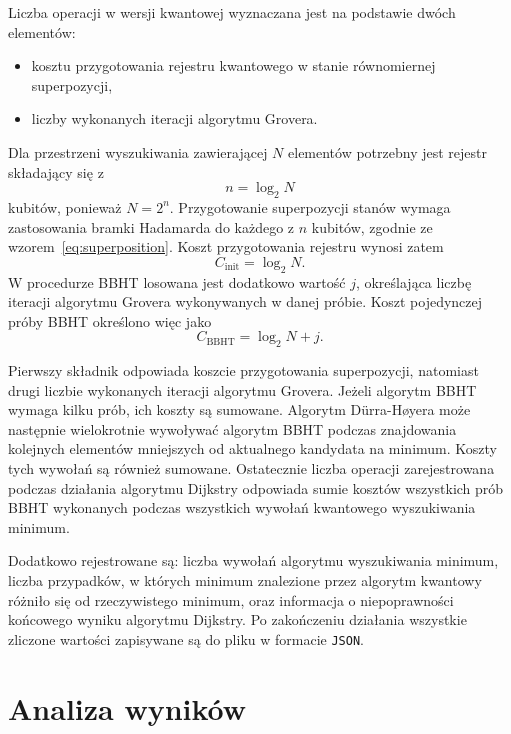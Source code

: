 Liczba operacji w wersji kwantowej wyznaczana jest na podstawie dwóch elementów:
\begin{itemize}
    \item kosztu przygotowania rejestru kwantowego w stanie równomiernej superpozycji,
    \item liczby wykonanych iteracji algorytmu Grovera.
\end{itemize}
\noindent
Dla przestrzeni wyszukiwania zawierającej $N$ elementów potrzebny jest rejestr składający się z
\begin{equation}
    n = \log_2 N
\end{equation}
\noindent
kubitów, ponieważ $N=2^n$. Przygotowanie superpozycji stanów wymaga zastosowania bramki Hadamarda do każdego z $n$ kubitów, zgodnie ze
wzorem~\eqref{eq:superposition}. Koszt przygotowania rejestru wynosi zatem
\begin{equation}
    C_{\mathrm{init}} = \log_2 N.
\end{equation}
\noindent
W procedurze BBHT losowana jest dodatkowo wartość $j$, określająca liczbę iteracji algorytmu Grovera wykonywanych w danej próbie. Koszt pojedynczej próby BBHT określono więc jako
\begin{equation}
    C_{\mathrm{BBHT}} = \log_2 N + j.
\end{equation}

Pierwszy składnik odpowiada koszcie przygotowania superpozycji, natomiast drugi liczbie wykonanych iteracji algorytmu Grovera. Jeżeli algorytm BBHT wymaga kilku prób, ich koszty są sumowane. Algorytm Dürra-Høyera może następnie wielokrotnie wywoływać algorytm BBHT podczas znajdowania kolejnych elementów mniejszych od aktualnego kandydata na minimum. Koszty tych wywołań są również sumowane. Ostatecznie liczba operacji zarejestrowana podczas działania algorytmu Dijkstry odpowiada sumie kosztów wszystkich prób BBHT wykonanych podczas wszystkich wywołań kwantowego wyszukiwania minimum.

Dodatkowo rejestrowane są: liczba wywołań algorytmu wyszukiwania minimum, liczba przypadków, w których minimum znalezione przez algorytm kwantowy różniło się od rzeczywistego minimum, oraz informacja o niepoprawności końcowego wyniku algorytmu Dijkstry. Po zakończeniu działania wszystkie zliczone wartości zapisywane są do pliku w formacie \texttt{JSON}.

\section{Analiza wyników}
\label{sec:results_analysis_implementation}


